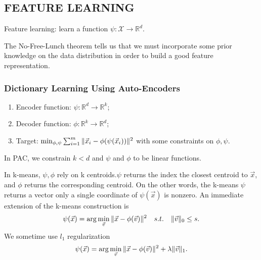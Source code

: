 \subsection{FEATURE LEARNING}%

Feature learning: learn a function $ \psi: \mathcal{X} \rightarrow \mathbb{R}^d $.

The {No-Free-Lunch} theorem tells us that we must incorporate some prior knowledge on the data distribution in order to build a good feature representation.

\subsubsection{Dictionary Learning Using Auto-Encoders}%

\begin{enumerate}
    \item Encoder function: $ \psi: \mathbb{R}^{d} \rightarrow \mathbb{R}^{k} $;
    \item Decoder function: $ \phi: \mathbb{R}^{k} \rightarrow \mathbb{R}^{d} $;
    \item Target: $ \min_{\phi, \psi}\sum^{m}_{i=1} \Arrowvert \vec{x}_i - \phi(\psi(\vec{x}_i)) \Arrowvert^2 $ with some constraints on $ \phi, \psi $.
\end{enumerate}

In {PAC}, we constrain $ k < d $ and $ \psi $ and $ \phi $ to be linear functions.

In {k-means}, $ \psi, \phi $ rely on k centroids.$ \psi $ returns the index the closest centroid to $ \vec{x} $, and $ \phi $ returns the corresponding centroid. 
On the other words, the k-means $ \psi $ returns a vector only a single coordinate of $ \psi(\vec{x}) $ is nonzero. An immediate extension of the k-means construction is
\[
    \psi(\vec{x}) = \arg\min_{\vec{v}} \Arrowvert \vec{x} - \phi(\vec{v}) \Arrowvert^2\quad s.t.\quad \Arrowvert \vec{v} \Arrowvert_0 \le s.
\]
We sometime use $ l_1 $ regularization
\[
    \psi(\vec{x}) = \arg\min_{\vec{v}} \Arrowvert \vec{x} - \phi(\vec{v}) \Arrowvert^2 + \lambda \Arrowvert \vec{v} \Arrowvert_1.
\]


